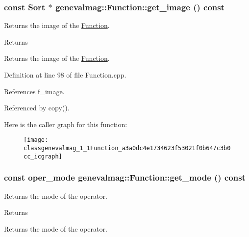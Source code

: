 \hypertarget{classgenevalmag_1_1Function_a3a0dc4e1734623f53021f0b647c3b0cc}{
\subsubsection[{get\_\-image}]{\setlength{\rightskip}{0pt plus 5cm}const {\bf Sort} $\ast$ genevalmag::Function::get\_\-image () const}}
\label{classgenevalmag_1_1Function_a3a0dc4e1734623f53021f0b647c3b0cc}
Returns the image of the \hyperlink{classgenevalmag_1_1Function}{Function}. \begin{DoxyReturn}{Returns}

\end{DoxyReturn}
Returns the image of the \hyperlink{classgenevalmag_1_1Function}{Function}. 

Definition at line 98 of file Function.cpp.



References f\_\-image.



Referenced by copy().



Here is the caller graph for this function:\nopagebreak
\begin{figure}[H]
\begin{center}
\leavevmode
\texttt{[image: classgenevalmag\_1\_1Function\_a3a0dc4e1734623f53021f0b647c3b0cc\_icgraph]}
\end{center}
\end{figure}


\hypertarget{classgenevalmag_1_1Function_a6db7c2695f9cce41c24e5cfea7406dd6}{
\subsubsection[{get\_\-mode}]{\setlength{\rightskip}{0pt plus 5cm}const {\bf oper\_\-mode} genevalmag::Function::get\_\-mode () const}}
\label{classgenevalmag_1_1Function_a6db7c2695f9cce41c24e5cfea7406dd6}
Returns the mode of the operator. \begin{DoxyReturn}{Returns}

\end{DoxyReturn}
Returns the mode of the operator. 

